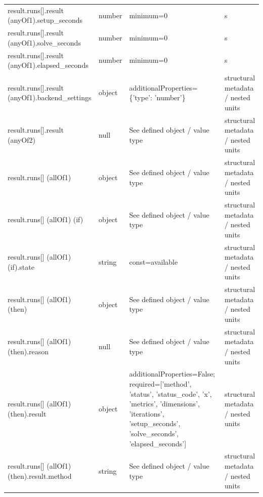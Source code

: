 \begin{longtable}{@{}>{\raggedright\arraybackslash}p{}>{\raggedright\arraybackslash}p{}>{\raggedright\arraybackslash}p{}>{\raggedright\arraybackslash}p{}@{}}
result.\allowbreak{}runs[].\allowbreak{}result (anyOf1).\allowbreak{}setup\_\allowbreak{}seconds & number & minimum=\allowbreak{}0 & s\\
result.\allowbreak{}runs[].\allowbreak{}result (anyOf1).\allowbreak{}solve\_\allowbreak{}seconds & number & minimum=\allowbreak{}0 & s\\
result.\allowbreak{}runs[].\allowbreak{}result (anyOf1).\allowbreak{}elapsed\_\allowbreak{}seconds & number & minimum=\allowbreak{}0 & s\\
result.\allowbreak{}runs[].\allowbreak{}result (anyOf1).\allowbreak{}backend\_\allowbreak{}settings & object & additionalProperties=\allowbreak{}\{'type': 'number'\} & structural metadata /\allowbreak{} nested units\\
result.\allowbreak{}runs[].\allowbreak{}result (anyOf2) & null & See defined object /\allowbreak{} value type & structural metadata /\allowbreak{} nested units\\
result.\allowbreak{}runs[] (allOf1) & object & See defined object /\allowbreak{} value type & structural metadata /\allowbreak{} nested units\\
result.\allowbreak{}runs[] (allOf1) (if) & object & See defined object /\allowbreak{} value type & structural metadata /\allowbreak{} nested units\\
result.\allowbreak{}runs[] (allOf1) (if).\allowbreak{}state & string & const=\allowbreak{}available & structural metadata /\allowbreak{} nested units\\
result.\allowbreak{}runs[] (allOf1) (then) & object & See defined object /\allowbreak{} value type & structural metadata /\allowbreak{} nested units\\
result.\allowbreak{}runs[] (allOf1) (then).\allowbreak{}reason & null & See defined object /\allowbreak{} value type & structural metadata /\allowbreak{} nested units\\
result.\allowbreak{}runs[] (allOf1) (then).\allowbreak{}result & object & additionalProperties=\allowbreak{}False; required=\allowbreak{}['method', 'status', 'status\_\allowbreak{}code', 'x', 'metrics', 'dimensions', 'iterations', 'setup\_\allowbreak{}seconds', 'solve\_\allowbreak{}seconds', 'elapsed\_\allowbreak{}seconds'] & structural metadata /\allowbreak{} nested units\\
result.\allowbreak{}runs[] (allOf1) (then).\allowbreak{}result.\allowbreak{}method & string & See defined object /\allowbreak{} value type & structural metadata /\allowbreak{} nested units\\

\end{longtable}
